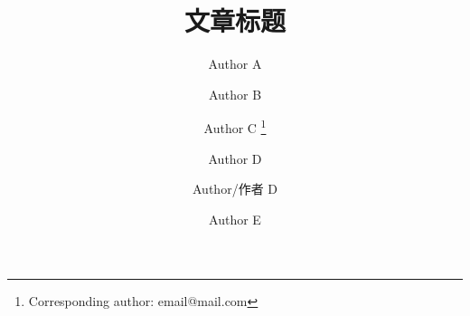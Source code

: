 

\title{文章标题}
\author[a]{Author A}									     %
\author[a]{Author B}									     %
\author[a]{Author C \thanks{Corresponding author: email@mail.com}}			     %
\author[b]{Author D}									     %
\author[b]{Author/作者 D}								     %
\author[b]{Author E}									     %
\renewcommand*{\Authfont}{\small\rm} %
\renewcommand*{\Affilfont}{\small\it} %
\renewcommand\Authands{ and } %
\renewcommand\Authands{ , } %
\date{} %


\maketitle

